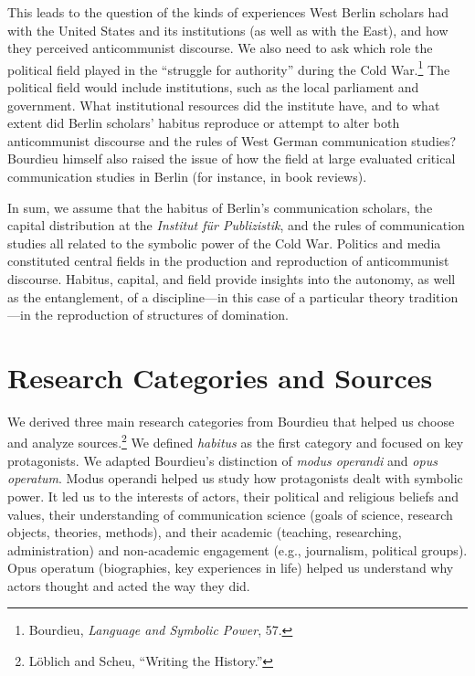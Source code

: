 \documentclass{tufte-handout}
\begin{document}
This leads to the question of the kinds of experiences West Berlin
scholars had with the United States and its institutions (as well as
with the East), and how they perceived anticommunist discourse. We also
need to ask which role the political field played in the ``struggle for
authority'' during the Cold War.\footnote{Bourdieu, \emph{Language and
  Symbolic Power}, 57.} The political field would include institutions,
such as the local parliament and government. What institutional
resources did the institute have, and to what extent did Berlin
scholars' habitus reproduce or attempt to alter both anticommunist
discourse and the rules of West German communication studies? Bourdieu
himself also raised the issue of how the field at large evaluated
critical communication studies in Berlin (for instance, in book
reviews).

In sum, we assume that the habitus of Berlin's communication scholars,
the capital distribution at the \emph{Institut für Publizistik}, and the
rules of communication studies all related to the symbolic power of the
Cold War. Politics and media constituted central fields in the
production and reproduction of anticommunist discourse. Habitus,
capital, and field provide insights into the autonomy, as well as the
entanglement, of a discipline---in this case of a particular theory
tradition---in the reproduction of structures of domination.

\hypertarget{research-categories-and-sources}{%
\section{Research Categories and
Sources}\label{research-categories-and-sources}}

We derived three main research categories from Bourdieu that helped us
choose and analyze sources.\footnote{Löblich and Scheu, ``Writing the
  History.''} We defined \emph{habitus} as the first category and
focused on key protagonists. We adapted Bourdieu's distinction of
\emph{modus operandi} and \emph{opus operatum}. Modus operandi helped us
study how protagonists dealt with symbolic power. It led us to the
interests of actors, their political and religious beliefs and values,
their understanding of communication science (goals of science, research
objects, theories, methods), and their academic (teaching, researching,
administration) and non-academic engagement (e.g., journalism, political
groups). Opus operatum (biographies, key experiences in life) helped us
understand why actors thought and acted the way they did.
\end{document}
